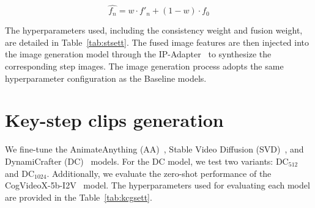 \[
\hat{f_n} = w \cdot f'_n + (1-w) \cdot f_0
\]

The hyperparameters used, including the consistency weight and fusion weight, are detailed in Table~\ref{tab:stsett}. The fused image features are then injected into the image generation model through the IP-Adapter~\cite{ip} to synthesize the corresponding step images. The image generation process adopts the same hyperparameter configuration as the Baseline models.

\begin{table}[h]
\centering
{}
\caption{Hyperparameters for Skill Transformer.}
\label{tab:stsett}
\end{table}

\section{Key-step clips generation}
\label{appendix kcg}

We fine-tune the AnimateAnything (AA)~\cite{aa}, Stable Video Diffusion (SVD)~\cite{SVD}, and DynamiCrafter (DC)~\cite{dynamicrafter} models. For the DC model, we test two variants: DC$_{512}$ and DC$_{1024}$. Additionally, we evaluate the zero-shot performance of the CogVideoX-5b-I2V~\cite{cogvideox} model. The hyperparameters used for evaluating each model are provided in the Table~\ref{tab:kcgsett}.


